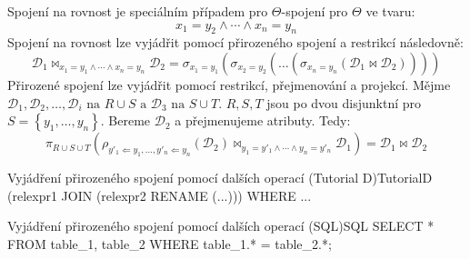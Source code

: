 Spojení na rovnost je speciálním případem pro $\Theta$-spojení pro $\Theta$ ve tvaru:
$$
x_{1} = y_{2} \land \cdots \land x_{n} = y_{n} 
$$
Spojení na rovnost lze vyjádřit pomocí přirozeného spojení a restrikcí následovně:
$$
\mathcal{D}_{1} \Join_{x_{1} = y_{1} \land \cdots \land x_{n} = y_{n}} \mathcal{D}_{2} = \sigma_{x_{1} = y_{1}} (\sigma_{x_{2} = y_{2}} (\ldots (\sigma_{x_{n} = y_{n}}(\mathcal{D}_{1} \Join \mathcal{D}_{2}))))
$$
Přirozené spojení lze vyjádřit pomocí restrikcí, přejmenování a projekcí. Mějme $\mathcal{D}_{1}, \mathcal{D}_{2}, \ldots, \mathcal{D}_{i} \text{ na } R \cup S \text{ a } \mathcal{D}_{3} \text{ na } S \cup T$. $R, S, T$ jsou po dvou disjunktní pro $S = \left\{ y_{1}, \ldots, y_{n} \right\}$. Bereme $\mathcal{D}_{2}$ a přejmenujeme atributy. Tedy:
$$
\pi_{R \cup S \cup T} (\rho_{y'_{1} \Leftarrow y_{1}, \ldots, y'_{n} \Leftarrow y_{n}} (\mathcal{D}_{2}) \Join_{y_{1} = y'_{1} \land \cdots \land y_{n} = y'_{n}} \mathcal{D}_{1}) = \mathcal{D}_{1} \Join \mathcal{D}_{2}
$$
\begin{upcode}{Vyjádření přirozeného spojení pomocí dalších operací (Tutorial D)}{}{TutorialD}
(relexpr1 JOIN (relexpr2 RENAME (...))) WHERE ...
\end{upcode}
\begin{upcode}{Vyjádření přirozeného spojení pomocí dalších operací (SQL)}{}{SQL}
SELECT * FROM table_1, table_2 WHERE table_1.* = table_2.*;
\end{upcode}